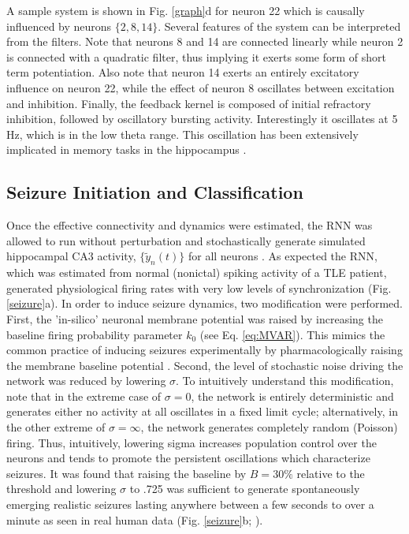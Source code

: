\documentclass[11pt,a4paper,final]{article}
\begin{document}
A sample system is shown in Fig. \ref{graph}d for neuron 22 which is causally influenced by neurons $\{2,8,14\}$.
Several features of the system can be interpreted from the filters.
Note that neurons 8 and 14 are connected linearly while neuron 2 is connected with a quadratic filter, thus implying it exerts some form of short term potentiation.
Also note that neuron 14 exerts an entirely excitatory influence on neuron 22, while the effect of neuron 8 oscillates between excitation and inhibition.
Finally, the feedback kernel is composed of initial refractory inhibition, followed by oscillatory bursting activity.
Interestingly it oscillates at 5 Hz, which is in the low theta range. 
This oscillation has been extensively implicated in memory tasks in the hippocampus \citep{buzsaki06,sandler14}.

    \subsection{Seizure Initiation and Classification}

Once the effective connectivity and dynamics were estimated, the RNN was allowed to run without perturbation and stochastically generate simulated hippocampal CA3 activity, $\{\tilde{y}_n(t)\}$ for all \nn{} neurons \citep{pillow08}.
As expected the RNN, which was estimated from normal (nonictal) spiking activity of a TLE patient, generated physiological firing rates with very low levels of synchronization (Fig. \ref{seizure}a).
In order to induce seizure dynamics, two modification were performed.
First, the 'in-silico' neuronal membrane potential was raised by increasing the baseline firing probability parameter $k_0$ (see Eq. \ref{eq:MVAR}).
This mimics the common practice of inducing seizures experimentally by pharmacologically raising the membrane baseline potential \citep{fricker99,avoli02}.
Second, the level of stochastic noise driving the network was reduced by lowering $\sigma$.
To intuitively understand this modification, note that in the extreme case of $\sigma=0$, the network is entirely deterministic and generates either no activity at all oscillates in a fixed limit cycle;
alternatively, in the other extreme of $\sigma=\infty$, the network generates completely random (Poisson) firing.
Thus, intuitively, lowering sigma increases population control over the neurons and tends to promote the persistent oscillations which characterize seizures.
It was found that raising the baseline by $B=30\%$ relative to the threshold and lowering $\sigma$ to .725 was sufficient to generate spontaneously emerging realistic seizures lasting anywhere between a few seconds to over a minute as seen in real human data (Fig. \ref{seizure}b; \citet{bower12,truccolo14}).	
\end{document}
